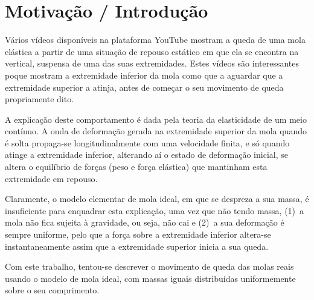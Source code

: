 \documentclass{article}
\begin{document}
\section*{Motivação / Introdução}
Vários vídeos disponíveis na plataforma YouTube mostram a queda de uma mola
elástica a partir de uma situação de repouso estático em que ela se encontra na
vertical, suspensa de uma das suas extremidades. Estes vídeos são interessantes
poque mostram a extremidade inferior da mola como que a aguardar que a
extremidade superior a atinja, antes de começar o seu movimento de queda
propriamente dito. 

A explicação deste comportamento é dada pela teoria da elasticidade de um meio
contínuo. A onda de deformação gerada na extremidade superior da mola quando é
solta propaga-se longitudinalmente com uma velocidade finita, e só quando atinge
a extremidade inferior, alterando aí o estado de deformação inicial, se altera o
equilíbrio de forças (peso e força elástica) que mantinham esta extremidade em
repouso.

Claramente, o modelo elementar de mola ideal, em que se despreza a sua massa, é
insuficiente para enquadrar esta explicação, uma vez que não tendo massa, (1)~a
mola não fica sujeita à gravidade, ou seja, não cai e (2)~a sua deformação é
sempre uniforme, pelo que a força sobre a extremidade inferior altera-se
instantaneamente assim que a extremidade superior inicia a sua queda. 

Com este trabalho, tentou-se descrever o movimento de queda das molas reais
usando o modelo de mola ideal, com massas iguais distribuídas uniformemente
sobre o seu comprimento.
\end{document}
